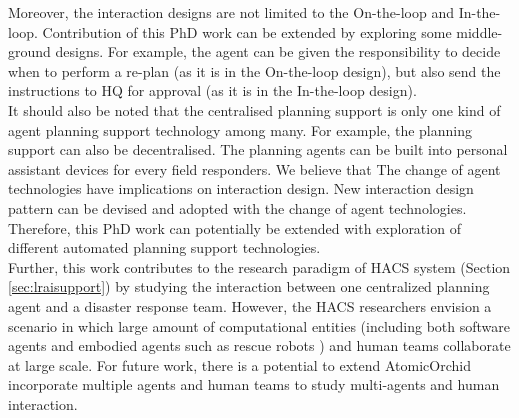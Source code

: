 Moreover, the interaction designs are not limited to the On-the-loop and In-the-loop. Contribution of this PhD work can be extended by exploring some middle-ground designs. For example, the agent can be given the responsibility to decide when to perform a re-plan (as it is in the On-the-loop design), but also send the instructions to HQ for approval (as it is in the In-the-loop design).\\

It should also be noted that the centralised planning support is only one kind of agent planning support technology among many. For example, the planning support can also be decentralised. The planning agents can be built into personal assistant devices for every field responders. We believe that The change of agent technologies have implications on interaction design. New interaction design pattern can be devised and adopted with the change of agent technologies. Therefore, this PhD work can potentially be extended with exploration of different automated planning support technologies.\\ 

Further, this work contributes to the research paradigm of \ac{HACS} system (Section \ref{sec:lraisupport}) by studying the interaction between one centralized planning agent and a disaster response team. However, the \ac{HACS} researchers envision a scenario in which large amount of computational entities (including both software agents and embodied agents such as rescue robots ) and human teams collaborate at large scale. For future work, there is a potential to extend AtomicOrchid incorporate multiple agents and human teams to study multi-agents and human interaction.\\




